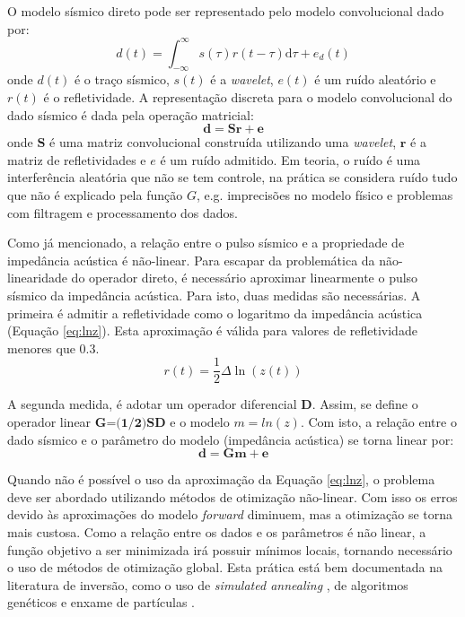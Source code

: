 O modelo sísmico direto pode ser representado pelo modelo convolucional dado por:
\begin{equation}
d(t) = \int_{-\infty}^{\infty} s(\tau) r(t - \tau)\mathrm{d}\tau + e_{d}(t)
\label{eq:conmodel}
\end{equation}
onde $d(t)$ é o traço sísmico, $s(t)$ é a \textit{wavelet}, $e(t)$ é
um ruído aleatório e $r(t)$ é o refletividade.
A representação discreta para o modelo convolucional do dado sísmico é
dada pela operação matricial: 
\begin{equation}
\label{eq:sismDiscreta}
\mathbf{d = Sr + e}
\end{equation}
onde $\mathbf{S}$ é uma matriz convolucional construída utilizando uma
\textit{wavelet}, $\mathbf{r}$ é a matriz de refletividades e $e$ é um
ruído admitido. Em teoria, o ruído é uma interferência aleatória que não se tem
controle, na prática se considera ruído tudo que não é explicado pela função
$G$, e.g. imprecisões no modelo físico e problemas com filtragem e processamento
dos dados.

Como já mencionado, a relação entre o pulso sísmico e a
propriedade de impedância acústica é não-linear.
Para escapar da problemática da não-linearidade do operador direto, é
necessário aproximar linearmente o pulso sísmico da impedância acústica.
Para isto, duas medidas são necessárias. A primeira é admitir a 
refletividade como o logaritmo da impedância acústica (Equação \ref{eq:lnz}).
Esta aproximação é válida para valores de refletividade menores que $0.3$.
\begin{equation}
r(t) = \frac{1}{2}\Delta \ln(z(t))
\label{eq:lnz}
\end{equation}

A segunda medida, é adotar um operador diferencial $\textbf{D}$. Assim,
se define o operador linear $\textbf{G=(1/2)SD}$ e o modelo $m=ln(z)$.
Com isto, a relação entre o dado sísmico e o parâmetro do modelo (impedância acústica)
se torna linear por:
\begin{equation}
\label{eq:sismDiscreta2}
\mathbf{d = Gm + e}
\end{equation}

Quando não é possível o uso da aproximação da Equação \ref{eq:lnz}, o problema
deve ser abordado utilizando métodos de otimização não-linear. Com isso os erros
devido às aproximações do modelo \textit{forward} diminuem, mas a otimização se
torna mais custosa. Como a relação entre os dados e os parâmetros é não linear, a
função objetivo a ser minimizada irá possuir mínimos locais, tornando necessário
o uso de métodos de otimização global. Esta prática está bem documentada na
literatura de inversão, como o uso de \textit{simulated annealing}
\citep{max_inv_simulated}, de algoritmos genéticos \citep{MallickGeneticInve} e
enxame de partículas \citep{zhe_nonlinear}. 

